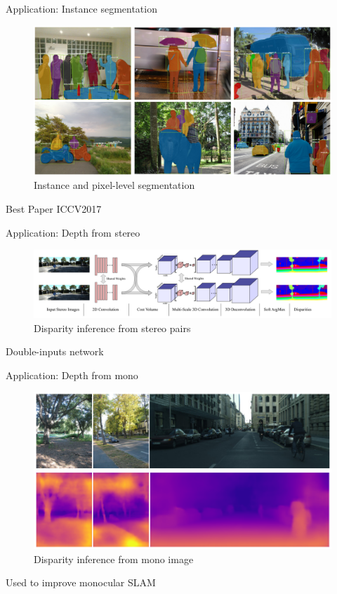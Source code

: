 \begin{frame}{Application: Instance segmentation}

	\begin{figure}
		\includegraphics[width=\linewidth]{images/maskrcnn.png}
		\caption{Instance and pixel-level segmentation}
	\end{figure}
	
 	Best Paper ICCV2017~\cite{MASKRCNN}
\end{frame}

\begin{frame}{Application: Depth from stereo}

	\begin{figure}
		\includegraphics[width=\linewidth]{images/gcnet.png}
		\caption{Disparity inference from stereo pairs}
	\end{figure}
	
	Double-inputs network
	
	\cite{GCNET}
\end{frame}

\begin{frame}{Application: Depth from mono}

	\begin{figure}
		\includegraphics[width=0.8\linewidth]{images/mono2depth.png}
		\caption{Disparity inference from mono image}
	\end{figure}
	
	Used to improve monocular SLAM~\cite{CNNSLAM}
	
	\cite{MONO2DEPTH}
\end{frame}


